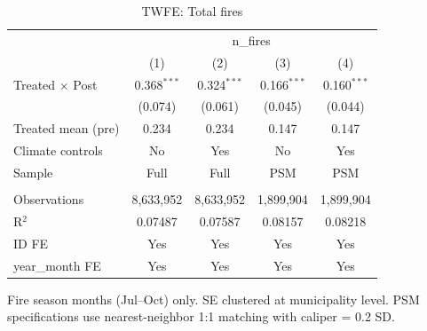 
\begin{table}[htbp]
   \caption{\label{tab:did_fire_n_fires} TWFE: Total fires}
   \bigskip
   \centering
   \small
   \begin{tabular}{lcccc}
      \toprule
       & \multicolumn{4}{c}{n\_fires}\\
                             & (1)           & (2)           & (3)           & (4)\\  
      \midrule 
      Treated $\times$ Post  & 0.368$^{***}$ & 0.324$^{***}$ & 0.166$^{***}$ & 0.160$^{***}$\\   
                             & (0.074)       & (0.061)       & (0.045)       & (0.044)\\   
      Treated mean (pre)     & 0.234         & 0.234         & 0.147         & 0.147\\  
      Climate controls       & No            & Yes           & No            & Yes\\  
      Sample                 & Full          & Full          & PSM           & PSM\\  
       \\
      Observations           & 8,633,952     & 8,633,952     & 1,899,904     & 1,899,904\\  
      R$^2$                  & 0.07487       & 0.07587       & 0.08157       & 0.08218\\  
      ID FE                  & Yes           & Yes           & Yes           & Yes\\  
      year\_month FE         & Yes           & Yes           & Yes           & Yes\\  
      \bottomrule
   \end{tabular}
   
   \par \raggedright 
   Fire season months (Jul--Oct) only. SE clustered at municipality level. PSM specifications use nearest-neighbor 1:1 matching with caliper = 0.2 SD.
\end{table}


